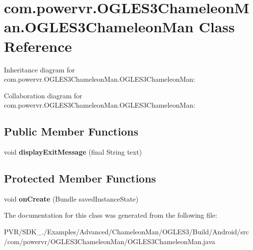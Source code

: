 \hypertarget{classcom_1_1powervr_1_1_o_g_l_e_s3_chameleon_man_1_1_o_g_l_e_s3_chameleon_man}{\section{com.\+powervr.\+O\+G\+L\+E\+S3\+Chameleon\+Man.\+O\+G\+L\+E\+S3\+Chameleon\+Man Class Reference}
\label{classcom_1_1powervr_1_1_o_g_l_e_s3_chameleon_man_1_1_o_g_l_e_s3_chameleon_man}
}


Inheritance diagram for com.\+powervr.\+O\+G\+L\+E\+S3\+Chameleon\+Man.\+O\+G\+L\+E\+S3\+Chameleon\+Man\+:


Collaboration diagram for com.\+powervr.\+O\+G\+L\+E\+S3\+Chameleon\+Man.\+O\+G\+L\+E\+S3\+Chameleon\+Man\+:
\subsection*{Public Member Functions}
\begin{DoxyCompactItemize}
\item 
\hypertarget{classcom_1_1powervr_1_1_o_g_l_e_s3_chameleon_man_1_1_o_g_l_e_s3_chameleon_man_a71a4e532431001606f0985fbcf880c33}{void {\bfseries display\+Exit\+Message} (final String text)}\label{classcom_1_1powervr_1_1_o_g_l_e_s3_chameleon_man_1_1_o_g_l_e_s3_chameleon_man_a71a4e532431001606f0985fbcf880c33}

\end{DoxyCompactItemize}
\subsection*{Protected Member Functions}
\begin{DoxyCompactItemize}
\item 
\hypertarget{classcom_1_1powervr_1_1_o_g_l_e_s3_chameleon_man_1_1_o_g_l_e_s3_chameleon_man_a1086ce7f92286491118800f487115a28}{void {\bfseries on\+Create} (Bundle saved\+Instance\+State)}\label{classcom_1_1powervr_1_1_o_g_l_e_s3_chameleon_man_1_1_o_g_l_e_s3_chameleon_man_a1086ce7f92286491118800f487115a28}

\end{DoxyCompactItemize}


The documentation for this class was generated from the following file\+:\begin{DoxyCompactItemize}
\item 
P\+V\+R/\+S\+D\+K\+\_./\+Examples/\+Advanced/\+Chameleon\+Man/\+O\+G\+L\+E\+S3/\+Build/\+Android/src/com/powervr/\+O\+G\+L\+E\+S3\+Chameleon\+Man/O\+G\+L\+E\+S3\+Chameleon\+Man.\+java\end{DoxyCompactItemize}

